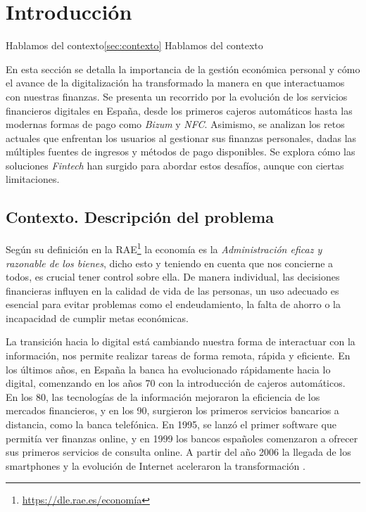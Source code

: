 \chapter{Introducción}
Hablamos del contexto\ref{sec:contexto}
Hablamos del contexto\label{sec:contexto}

En esta sección se detalla la importancia de la gestión económica personal y cómo el avance de la digitalización ha transformado la manera en que interactuamos con nuestras finanzas. Se presenta un recorrido por la evolución de los servicios financieros digitales en España, desde los primeros cajeros automáticos hasta las modernas formas de pago como \textit{Bizum} y \textit{NFC}. Asimismo, se analizan los retos actuales que enfrentan los usuarios al gestionar sus finanzas personales, dadas las múltiples fuentes de ingresos y métodos de pago disponibles. Se explora cómo las soluciones \textit{Fintech} han surgido para abordar estos desafíos, aunque con ciertas limitaciones.

\section{Contexto. Descripción del problema} 
Según su definición en la RAE\footnote{\href{https://dle.rae.es/economía}{https://dle.rae.es/economía}} la economía es la 
\textit{Administración eficaz y razonable de los bienes}, dicho esto y teniendo en 
cuenta que nos concierne a todos, es crucial tener control sobre ella. 
De manera individual, las decisiones financieras influyen en la calidad de vida de las personas,
un uso adecuado es esencial para evitar problemas como el endeudamiento, la 
falta de ahorro o la incapacidad de cumplir metas económicas.

La transición hacia lo digital está cambiando nuestra forma de interactuar con 
la información, nos permite realizar tareas de forma remota, rápida y eficiente. 
En los últimos años, en España la banca ha evolucionado rápidamente hacia lo digital, comenzando en los años 70 con la introducción de cajeros automáticos. En los 80, las tecnologías de la información mejoraron la eficiencia de los mercados financieros, y en los 90, surgieron los primeros servicios bancarios a distancia, como la banca telefónica. En 1995, se lanzó el primer software que permitía ver finanzas online, y en 1999 los bancos españoles comenzaron a ofrecer sus primeros servicios de consulta online. A partir del año 2006 la llegada de los smartphones y la evolución de Internet aceleraron la transformación \cite{hebrero2022fintech}.

